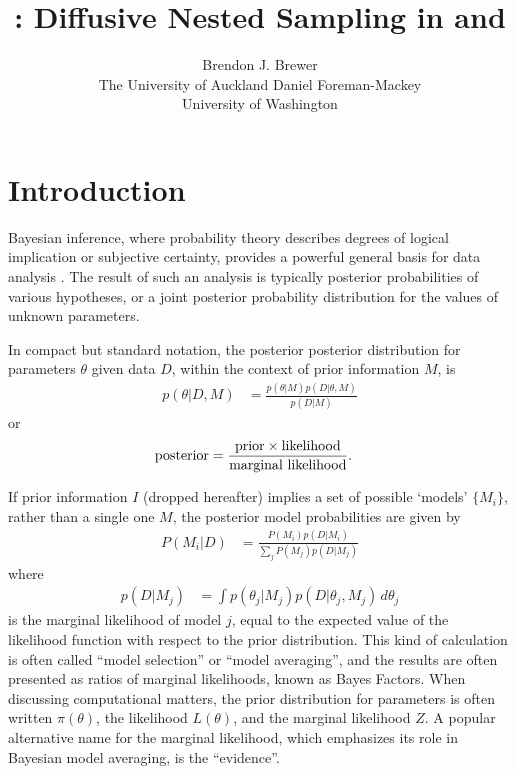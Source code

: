 \documentclass[article, nojss]{jss}
\author{Brendon J. Brewer\\The University of Auckland\And 
        Daniel Foreman-Mackey\\University of Washington}
\title{\pkg{DNest4}: Diffusive Nested Sampling in
\proglang{C++} and \proglang{Python}}
\newcommand{\params}{\theta}
\newcommand{\data}{D}
\begin{document}
\maketitle


\section{Introduction}
Bayesian inference, where probability theory describes degrees of
logical implication or subjective certainty, provides a powerful general basis
for data analysis \citep{o2004kendall, sivia2006data}. The result of such
an analysis is typically
posterior probabilities of various hypotheses, or
a joint posterior probability distribution for the values of unknown
parameters.

In compact but standard notation, the posterior
posterior distribution for parameters $\params$ given data $\data$, within
the context of prior information $M$, is
\begin{align}
p(\params | \data, M) &=
\frac{p(\params | M)p(\data | \params, M)}{p(\data | M)}
\end{align}
or
\begin{align}
\textnormal{posterior} &=
\frac{\textnormal{prior} \times \textnormal{likelihood}}
     {\textnormal{marginal likelihood}}.
\end{align}

If prior information $I$ (dropped hereafter)
implies a set of possible `models' $\{M_i\}$,
rather than a single one $M$, the posterior model probabilities are given by
\begin{align}
P(M_i | \data) &=
\frac{P(M_i)p(\data | M_i)}{\sum_j P(M_j)p(\data | M_j)}
\end{align}
where
\begin{align}
p(\data | M_j) &= \int p(\theta_j | M_j)p(\data | \theta_j, M_j) \, d\theta_j
\end{align}
is the marginal likelihood of model $j$, equal to the expected value of the
likelihood function with respect to the prior distribution.
This kind of calculation is often
called ``model selection'' or ``model averaging'', and the results
are often presented as ratios
of marginal likelihoods, known as Bayes Factors.
When discussing computational matters, the prior distribution for parameters
is
often written $\pi(\theta)$, the likelihood $L(\theta)$,
and the marginal likelihood $Z$. A popular alternative name for the marginal
likelihood, which emphasizes its role in Bayesian model averaging,
is the ``evidence''.
\end{document}
